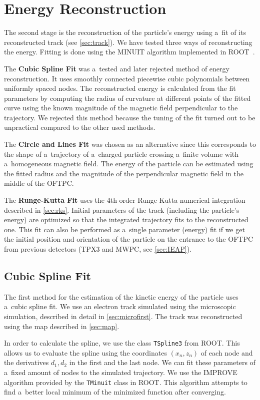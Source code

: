 \chapter{Energy Reconstruction}
\label{sec:energy}
	The second stage is the reconstruction of the particle's energy using a~fit of its reconstructed track (see \cref{sec:track}). We have tested three ways of reconstructing the energy. Fitting is done using the MINUIT algorithm implemented in ROOT~\cite{ROOT}.
	
	The \textbf{Cubic Spline Fit} was a~tested and later rejected method of energy reconstruction. It uses smoothly connected piecewise cubic polynomials between uniformly spaced nodes. The reconstructed energy is calculated from the fit parameters by computing the radius of curvature at different points of the fitted curve using the known magnitude of the magnetic field perpendicular to the trajectory. We rejected this method because the tuning of the fit turned out to be unpractical compared to the other used methods.
	
	The \textbf{Circle and Lines Fit} was chosen as an alternative since this corresponds to the shape of a~trajectory of a~charged particle crossing a~finite volume with a~homogeneous magnetic field. The energy of the particle can be estimated using the fitted radius and the magnitude of the perpendicular magnetic field in the middle of the \ac{OFTPC}.
	
	The \textbf{Runge-Kutta Fit} uses the 4th order Runge-Kutta numerical integration described in \cref{sec:rks}. Initial parameters of the track (including the particle's energy) are optimized so that the integrated trajectory fits to the reconstructed one. This fit can also be performed as a~single parameter (energy) fit if we get the initial position and orientation of the particle on the entrance to the \ac{OFTPC} from previous detectors (\ac{TPX3} and \ac{MWPC}, see \cref{sec:IEAP}).
	
	\section{Cubic Spline Fit}
	\label{sec:cspline}
		The first method for the estimation of the kinetic energy of the particle uses a~cubic spline fit. We use an electron track simulated using the microscopic simulation, described in detail in \cref{sec:microfirst}. The track was reconstructed using the map described in \cref{sec:map}.
				
		In order to calculate the spline, we use the class \texttt{TSpline3} from ROOT. This allows us to evaluate the spline using the coordinates $(x_n,z_n)$ of each node and the derivatives $d_1,d_2$ in the first and the last node. We can fit these parameters of a~fixed amount of nodes to the simulated trajectory. We use the IMPROVE algorithm provided by the \texttt{TMinuit} class in ROOT. This algorithm attempts to find a~better local minimum of the minimized function after converging.
		
